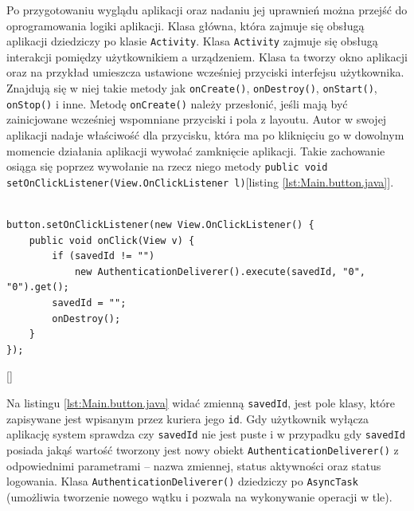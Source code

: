 \documentclass[eng,printmode,oneside]{mgr}
\begin{document}
Po przygotowaniu wyglądu aplikacji oraz nadaniu jej uprawnień można przejść
do oprogramowania logiki aplikacji. Klasa główna, która zajmuje się obsługą
aplikacji dziedziczy po klasie \texttt{Activity}. Klasa \texttt{Activity} zajmuje
się obsługą interakcji pomiędzy użytkownikiem a urządzeniem. Klasa ta tworzy okno aplikacji
oraz na przykład umieszcza ustawione wcześniej przyciski interfejsu użytkownika.
Znajdują się w niej takie metody jak \texttt{onCreate()}, \texttt{onDestroy()},
\texttt{onStart()}, \texttt{onStop()} i inne. Metodę \texttt{onCreate()} należy
przesłonić, jeśli mają być zainicjowane wcześniej wspomniane przyciski i pola z layoutu. Autor w swojej aplikacji nadaje
właściwość dla przycisku, która ma po kliknięciu go w dowolnym momencie
działania aplikacji wywołać zamknięcie aplikacji. Takie zachowanie osiąga się
poprzez wywołanie na rzecz niego metody \texttt{public void
setOnClickListener(View.OnClickListener l)}[listing \ref{lst:Main.button.java}].

\begin{lstlisting}[caption=Ustawienie właściwości przycisku
``Off'' w głównej klasie aplikacji mobilnej w
metodzie onCreate(),label=lst:Main.button.java] 

button.setOnClickListener(new View.OnClickListener() { 
	public void onClick(View v) { 
		if (savedId != "")
			new AuthenticationDeliverer().execute(savedId, "0", "0").get();
		savedId = "";
		onDestroy();
	}
});
\end{lstlisting}
\ref{}

Na listingu \ref{lst:Main.button.java} widać zmienną \texttt{savedId},
jest pole klasy, które zapisywane jest wpisanym przez kuriera jego \texttt{id}. Gdy użytkownik wyłącza
aplikację system sprawdza czy \texttt{savedId} nie jest puste i w przypadku gdy
\texttt{savedId} posiada jakąś wartość tworzony jest nowy obiekt
\texttt{AuthenticationDeliverer()} z odpowiednimi parametrami -- nazwa
zmiennej, status aktywności oraz status logowania. Klasa
\texttt{AuthenticationDeliverer()} dziedziczy po \texttt{AsyncTask} (umożliwia
tworzenie nowego wątku i pozwala na wykonywanie operacji w tle). 
\end{document}
